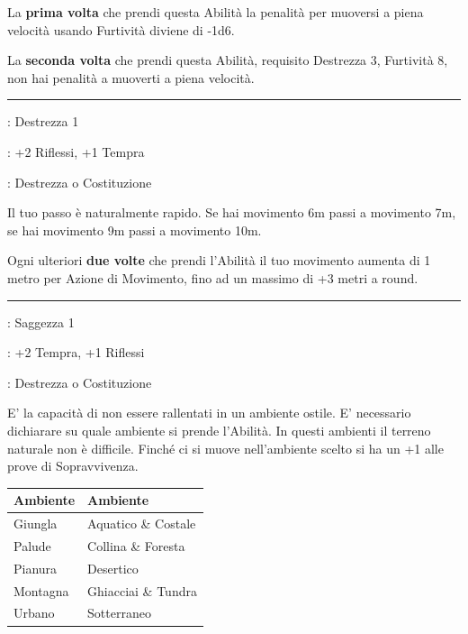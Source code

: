 \begin{multicols}{2}
La \textbf{prima volta} che prendi questa Abilità la penalità per muoversi a piena velocità usando Furtività diviene di -1d6.

La \textbf{seconda volta} che prendi questa Abilità, requisito Destrezza 3, Furtività 8, non hai penalità a muoverti a piena velocità.

\smallskip\noindent\rule{\linewidth}{2pt} \hypertarget{abPasso Veloce}{}\medskip{}
\noindent
\begin{description}[noitemsep, topsep=0pt, parsep=0pt, partopsep=0pt, leftmargin=0cm, labelwidth=2.5cm]
    \item[\textbf{Requisito}]: Destrezza 1
    \item[\textbf{Tiri Salvezza}]: +2 Riflessi, +1 Tempra
    \item[\textbf{Caratteristica}]: Destrezza o Costituzione
\end{description}

Il tuo passo è naturalmente rapido.
Se hai movimento 6m passi a movimento 7m, se hai movimento 9m passi a movimento 10m.

Ogni ulteriori \textbf{due volte} che prendi l'Abilità il tuo movimento aumenta di 1 metro per Azione di Movimento, fino ad un massimo di +3 metri a round.

\smallskip\noindent\rule{\linewidth}{2pt} \hypertarget{Passo Sicuro}{}\medskip{}
\noindent
\begin{description}[noitemsep, topsep=0pt, parsep=0pt, partopsep=0pt, leftmargin=0cm, labelwidth=2.5cm]
    \item[\textbf{Requisito}]: Saggezza 1
    \item[\textbf{Tiri Salvezza}]: +2 Tempra, +1 Riflessi
    \item[\textbf{Caratteristica}]: Destrezza o Costituzione
\end{description}

E' la capacità di non essere rallentati in un ambiente ostile. E' necessario dichiarare su quale ambiente si prende l'Abilità. In questi ambienti il terreno naturale non è difficile. Finché ci si muove nell'ambiente scelto si ha un +1 alle prove di Sopravvivenza.

\medskip

\begin{tabular}{l|l}
\textbf{Ambiente} & \textbf{Ambiente}\\
\toprule
Giungla & Aquatico \& Costale\\
Palude & Collina \& Foresta \\
Pianura & Desertico \\
Montagna & Ghiacciai \& Tundra \\
Urbano& Sotterraneo
\end{tabular}


\end{multicols}
